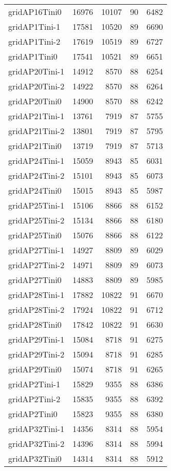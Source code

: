 \begin{longtable}{lrrrr}
gridAP16Tini0 & 16976 & 10107 & 90 & 6482 \\
gridAP1Tini-1 & 17581 & 10520 & 89 & 6690 \\
gridAP1Tini-2 & 17619 & 10519 & 89 & 6727 \\
gridAP1Tini0 & 17541 & 10521 & 89 & 6651 \\
gridAP20Tini-1 & 14912 & 8570 & 88 & 6254 \\
gridAP20Tini-2 & 14922 & 8570 & 88 & 6264 \\
gridAP20Tini0 & 14900 & 8570 & 88 & 6242 \\
gridAP21Tini-1 & 13761 & 7919 & 87 & 5755 \\
gridAP21Tini-2 & 13801 & 7919 & 87 & 5795 \\
gridAP21Tini0 & 13719 & 7919 & 87 & 5713 \\
gridAP24Tini-1 & 15059 & 8943 & 85 & 6031 \\
gridAP24Tini-2 & 15101 & 8943 & 85 & 6073 \\
gridAP24Tini0 & 15015 & 8943 & 85 & 5987 \\
gridAP25Tini-1 & 15106 & 8866 & 88 & 6152 \\
gridAP25Tini-2 & 15134 & 8866 & 88 & 6180 \\
gridAP25Tini0 & 15076 & 8866 & 88 & 6122 \\
gridAP27Tini-1 & 14927 & 8809 & 89 & 6029 \\
gridAP27Tini-2 & 14971 & 8809 & 89 & 6073 \\
gridAP27Tini0 & 14883 & 8809 & 89 & 5985 \\
gridAP28Tini-1 & 17882 & 10822 & 91 & 6670 \\
gridAP28Tini-2 & 17924 & 10822 & 91 & 6712 \\
gridAP28Tini0 & 17842 & 10822 & 91 & 6630 \\
gridAP29Tini-1 & 15084 & 8718 & 91 & 6275 \\
gridAP29Tini-2 & 15094 & 8718 & 91 & 6285 \\
gridAP29Tini0 & 15074 & 8718 & 91 & 6265 \\
gridAP2Tini-1 & 15829 & 9355 & 88 & 6386 \\
gridAP2Tini-2 & 15835 & 9355 & 88 & 6392 \\
gridAP2Tini0 & 15823 & 9355 & 88 & 6380 \\
gridAP32Tini-1 & 14356 & 8314 & 88 & 5954 \\
gridAP32Tini-2 & 14396 & 8314 & 88 & 5994 \\
gridAP32Tini0 & 14314 & 8314 & 88 & 5912 \\

\end{longtable}
